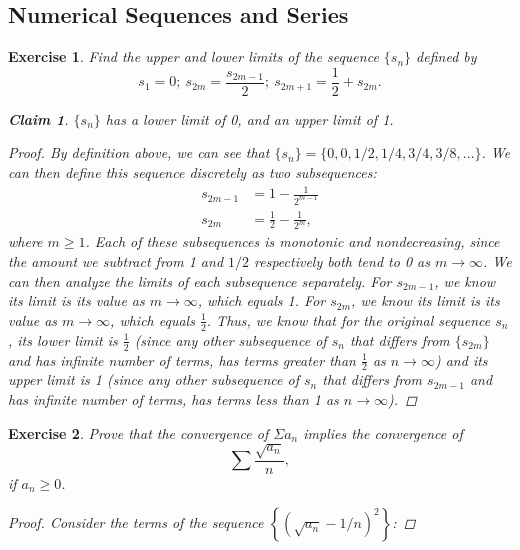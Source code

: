 \documentclass[10pt,letterpaper]{amsart}
\newtheorem{exercise}{Exercise}[section]
\newtheorem*{claim}{Claim}
\theoremstyle{definition}
\theoremstyle{remark}
\numberwithin{equation}{exercise}
\begin{document}
\begin{multicols}{2}
  \section{Numerical Sequences and Series}
  \setcounter{exercise}{3}
  \begin{exercise}\label{3.4}
    Find the upper and lower limits of the sequence $\{s_n\}$ defined by
    \begin{equation*}
      s_1 = 0;\ s_{2m} = \frac{s_{2m-1}}{2};\ s_{2m+1} = \frac{1}{2} + s_{2m}.
    \end{equation*}
    \begin{claim}
      $\{s_n\}$ has a lower limit of 0, and an upper limit of 1.
    \end{claim}
    \begin{proof}
      By definition above, we can see that $\{s_n\} = \{0,0,1/2,1/4,3/4,3/8,\ldots\}$. We can then define this sequence discretely as two subsequences:
      \begin{align*}
        s_{2m-1} &= 1 - \frac{1}{2^{m-1}}\\
        s_{2m} &= \frac{1}{2} - \frac{1}{2^m},
      \end{align*}
      where $m \ge 1$. Each of these subsequences is monotonic and nondecreasing, since the amount we subtract from 1 and $1/2$ respectively both tend to 0 as $m \to \infty$. We can then analyze the limits of each subsequence separately. For $s_{2m-1}$, we know its limit is its value as $m \rightarrow \infty$, which equals 1. For $s_{2m}$, we know its limit is its value as $m \rightarrow \infty$, which equals $\frac{1}{2}$. Thus, we know that for the original sequence $s_n$, its lower limit is $\frac{1}{2}$ (since any other subsequence of $s_n$ that differs from $\{s_{2m}\}$ and has infinite number of terms, has terms greater than $\frac{1}{2}$ as $n \rightarrow \infty$) and its upper limit is 1 (since any other subsequence of $s_n$ that differs from $s_{2m-1}$ and has infinite number of terms, has terms less than 1 as $n \rightarrow \infty$).
    \end{proof}
  \end{exercise}
  \setcounter{exercise}{6}
  \begin{exercise}\label{3.7}
    Prove that the convergence of $\Sigma a_n$ implies the convergence of
    \begin{equation*}
      \sum \frac{\sqrt{a_n}}{n},
    \end{equation*}
    if $a_n \ge 0$.
    \begin{proof}
      Consider the terms of the sequence $\left\{\left(\sqrt{a_n} - 1/n\right)^2\right\}$:

\end{proof}
\end{exercise}
\end{multicols}
\end{document}
